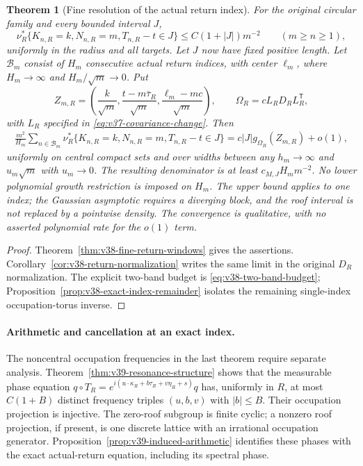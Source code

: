 \documentclass[11pt,reqno]{amsart}
\numberwithin{equation}{section}
\newtheorem{leadtheorem}{Theorem}
\theoremstyle{definition}\newtheorem{definition}[theorem]{Definition}
\theoremstyle{remark}\newtheorem{remark}[theorem]{Remark}
\begin{document}
\begin{leadtheorem}[Fine resolution of the actual return index]
\label{thm:intro-v38-fine-returns}
For the original circular family and every bounded interval $J$,
\[
 \nu_R^*\{K_{n,R}=k,N_{n,R}=m,T_{n,R}-t\in J\}
       \le C(1+|J|)m^{-2}\qquad(m\ge n\ge1),
\]
uniformly in the radius and all targets. Let $J$ now have fixed positive
length. Let $\mathcal B_m$ consist of $H_m$ consecutive actual return
indices, with center $\ell_m$, where $H_m\to\infty$ and
$H_m/\sqrt m\to0$. Put
\[
 Z_{m,R}=\left(\frac{k}{\sqrt m},
       \frac{t-m\bar\tau_R}{\sqrt m},
       \frac{\ell_m-mc}{\sqrt m}\right),\qquad
 \Omega_R=cL_RD_RL_R^{\mathsf T},
\]
with $L_R$ specified in \eqref{eq:v37-covariance-change}. Then
\begin{align}\label{eq:intro-v38-fine-returns}
 \frac{m^2}{H_m}\sum_{n\in\mathcal B_m}
 \nu_R^*\{K_{n,R}=k,N_{n,R}=m,T_{n,R}-t\in J\}
       =c|J|g_{\Omega_R}(Z_{m,R})+o(1),
\end{align}
uniformly on central compact sets and over widths between any
$h_m\to\infty$ and $u_m\sqrt m$ with $u_m\to0$.
The resulting denominator is at least $c_{M,J}H_mm^{-2}$.
No lower polynomial growth restriction is imposed on $H_m$.
The upper bound applies to one index; the Gaussian asymptotic requires
a diverging block, and the roof interval is not replaced by a pointwise
density. The convergence is qualitative, with no asserted polynomial
rate for the $o(1)$ term.
\end{leadtheorem}
\begin{proof}
Theorem~\ref{thm:v38-fine-return-windows} gives the assertions.
Corollary~\ref{cor:v38-return-normalization} writes the same limit in
the original $D_R$ normalization. The explicit two-band budget is
\eqref{eq:v38-two-band-budget};
Proposition~\ref{prop:v38-exact-index-remainder} isolates the remaining
single-index occupation-torus inverse.
\end{proof}

\paragraph{Arithmetic and cancellation at an exact index.}
The noncentral occupation frequencies in the last theorem require
separate analysis. Theorem~\ref{thm:v39-resonance-structure} shows that
the measurable phase equation
$q\circ T_R=e^{i(u\cdot\kappa_R+b\tau_R+v\eta_R+s)}q$
has, uniformly in $R$, at most $C(1+B)$ distinct frequency triples
$(u,b,v)$ with $|b|\le B$. Their occupation projection is injective.
The zero-roof subgroup is finite cyclic; a nonzero roof projection, if
present, is one discrete lattice with an irrational occupation generator.
Proposition~\ref{prop:v39-induced-arithmetic} identifies these phases
with the exact actual-return equation, including its spectral phase.
\end{document}
